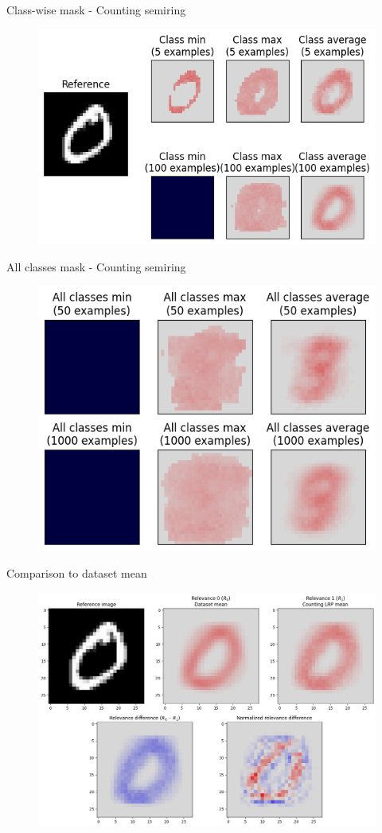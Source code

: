 \documentclass[aspectratio=169]{beamer}
\theoremstyle{definition}
\begin{document}
\begin{frame}{Class-wise mask - Counting semiring}
    \begin{figure}
        \includegraphics[width=.75\textwidth]{counting-mask.png}
    \end{figure}
\end{frame}

\begin{frame}{All classes mask - Counting semiring}
    \begin{figure}
        \includegraphics[width=.6\textwidth]{counting-mask-all.png}
    \end{figure}
\end{frame}

\begin{frame}{Comparison to dataset mean}
    \begin{figure}
        \includegraphics[width=.7\textwidth]{dataset-relevance-cmp.png}
    \end{figure}
\end{frame}
\end{document}
